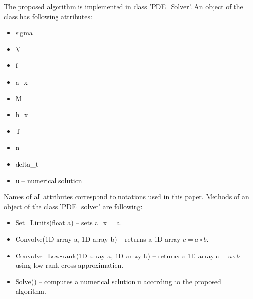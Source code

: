 \documentclass[11pt,a4paper]{extarticle}
\begin{document}
The proposed algorithm is implemented in class 'PDE\_Solver'.
An object of the class has following attributes:
\begin{itemize}
    \item sigma
    \item V
    \item f
    \item a\_x
    \item M
    \item h\_x
    \item T
    \item n
    \item delta\_t
    \item u -- numerical solution
\end{itemize}
Names of all attributes correspond to notations used in this paper.
Methods of an object of the class 'PDE\_solver' are following:
\begin{itemize}
    \item Set\_Limits(float a) -- sets a\_x = a.
    \item Convolve(1D array a, 1D array b) -- returns a 1D array $c = a \circ b$.
    \item Convolve\_Low-rank(1D array a, 1D array b) -- returns a 1D array $c = a \circ b$ using low-rank cross approximation.
    \item Solve() -- computes a numerical solution u according to the proposed algorithm.
\end{itemize}
        		
\end{document}
